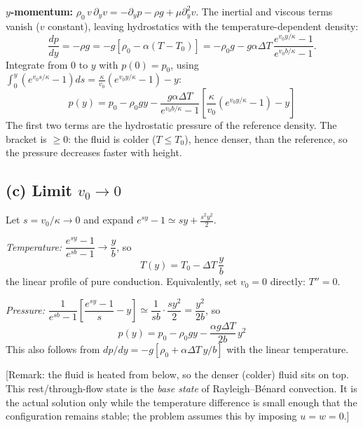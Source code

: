 \documentclass[11pt]{article}
\newcommand{\pd}{\partial}
\newcommand{\why}[1]{{\color{gray}\small[#1]}}
\begin{document}
\textbf{$y$-momentum:} $\rho_0\,v\,\pd_yv=-\pd_yp-\rho g+\mu\pd_y^2v$. The inertial and viscous terms vanish ($v$ constant), leaving hydrostatics with the temperature-dependent density:
\[
\frac{dp}{dy}=-\rho g=-g\left[\rho_0-\alpha\left(T-T_0\right)\right]=-\rho_0g-g\alpha\Delta T\,\frac{e^{v_0y/\kappa}-1}{e^{v_0b/\kappa}-1}.
\]
Integrate from $0$ to $y$ with $p(0)=p_0$, using $\int_0^y\left(e^{v_0s/\kappa}-1\right)ds=\frac{\kappa}{v_0}\left(e^{v_0y/\kappa}-1\right)-y$:
\[
\boxed{p(y)=p_0-\rho_0gy-\frac{g\alpha\Delta T}{e^{v_0b/\kappa}-1}\left[\frac{\kappa}{v_0}\left(e^{v_0y/\kappa}-1\right)-y\right]}
\]
The first two terms are the hydrostatic pressure of the reference density. The bracket is $\ge0$: the fluid is colder ($T\le T_0$), hence denser, than the reference, so the pressure decreases faster with height.

\subsection*{(c) Limit $v_0\to0$}
Let $s=v_0/\kappa\to0$ and expand $e^{sy}-1\simeq sy+\frac{s^2y^2}{2}$.

\emph{Temperature:} $\dfrac{e^{sy}-1}{e^{sb}-1}\to\dfrac{y}{b}$, so
\[
\boxed{T(y)=T_0-\Delta T\,\frac{y}{b}}
\]
the linear profile of pure conduction. Equivalently, set $v_0=0$ directly: $T''=0$.

\emph{Pressure:} $\dfrac{1}{e^{sb}-1}\left[\dfrac{e^{sy}-1}{s}-y\right]\simeq\dfrac{1}{sb}\cdot\dfrac{sy^2}{2}=\dfrac{y^2}{2b}$, so
\[
\boxed{p(y)=p_0-\rho_0gy-\frac{\alpha g\Delta T}{2b}\,y^2}
\]
This also follows from $dp/dy=-g[\rho_0+\alpha\Delta T\,y/b]$ with the linear temperature.

\why{Remark: the fluid is heated from below, so the denser (colder) fluid sits on top. This rest/through-flow state is the \emph{base state} of Rayleigh--Bénard convection. It is the actual solution only while the temperature difference is small enough that the configuration remains stable; the problem assumes this by imposing $u=w=0$.}
\end{document}
